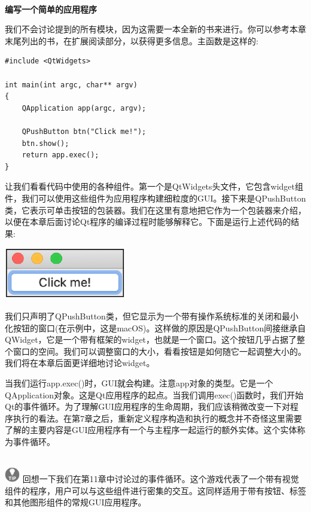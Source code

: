 \noindent\textbf{}\ \par
\textbf{编写一个简单的应用程序} \ \par
我们不会讨论提到的所有模块，因为这需要一本全新的书来进行。你可以参考本章末尾列出的书，在扩展阅读部分，以获得更多信息。主函数是这样的: \par

\begin{lstlisting}[caption={}]
#include <QtWidgets>

int main(int argc, char** argv)
{
	QApplication app(argc, argv);
	
	QPushButton btn("Click me!");
	btn.show();
	return app.exec();
}
\end{lstlisting}

让我们看看代码中使用的各种组件。第一个是QtWidgets头文件，它包含widget组件，我们可以使用这些组件为应用程序构建细粒度的GUI。接下来是QPushButton类，它表示可单击按钮的包装器。我们在这里有意地把它作为一个包装器来介绍，以便在本章后面讨论Qt程序的编译过程时能够解释它。下面是运行上述代码的结果: \par

\begin{center}
	\includegraphics[width=0.4\textwidth]{content/Section-2/Chapter-14/5}
\end{center}

我们只声明了QPushButton类，但它显示为一个带有操作系统标准的关闭和最小化按钮的窗口(在示例中，这是macOS)。这样做的原因是QPushButton间接继承自QWidget，它是一个带有框架的widget，也就是一个窗口。这个按钮几乎占据了整个窗口的空间。我们可以调整窗口的大小，看看按钮是如何随它一起调整大小的。我们将在本章后面更详细地讨论widget。 \par
当我们运行app.exec()时，GUI就会构建。注意app对象的类型。它是一个QApplication对象。这是Qt应用程序的起点。当我们调用exec()函数时，我们开始Qt的事件循环。为了理解GUI应用程序的生命周期，我们应该稍微改变一下对程序执行的看法。在第7章之后，重新定义程序构造和执行的概念并不奇怪这里需要了解的主要内容是GUI应用程序有一个与主程序一起运行的额外实体。这个实体称为事件循环。 \par

\hspace*{\fill} \\ %
\includegraphics[width=0.05\textwidth]{images/tip}
回想一下我们在第11章中讨论过的事件循环。这个游戏代表了一个带有视觉组件的程序，用户可以与这些组件进行密集的交互。这同样适用于带有按钮、标签和其他图形组件的常规GUI应用程序。 \par
\noindent\textbf{}\ \par

